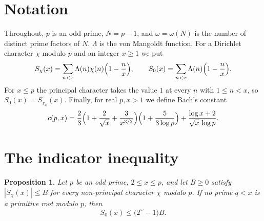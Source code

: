 \documentclass[11pt]{amsart}
\newtheorem{proposition}[theorem]{Proposition}
\theoremstyle{definition}
\theoremstyle{remark}
\newcommand{\Lam}{\Lambda}
\begin{document}
\section{Notation}\label{sec:setup}

Throughout, $p$ is an odd prime, $N=p-1$, and $\omega=\omega(N)$ is the number of distinct prime factors of $N$. $\Lam$ is the von Mangoldt function. For a Dirichlet character $\chi$ modulo $p$ and an integer $x\ge 1$ we put
\[
S_\chi(x)=\sum_{n<x}\Lam(n)\chi(n)\Bigl(1-\frac nx\Bigr),\qquad S_0(x)=\sum_{n<x}\Lam(n)\Bigl(1-\frac nx\Bigr).
\]
For $x\le p$ the principal character takes the value $1$ at every $n$ with $1\le n<x$, so $S_0(x)=S_{\chi_0}(x)$. Finally, for real $p,x>1$ we define Bach's constant
\begin{equation}\label{eq:cpx}
c(p,x)=\frac23\Bigl(1+\frac{2}{\sqrt x}+\frac{3}{x^{3/2}}\Bigr)\Bigl(1+\frac{5}{3\log p}\Bigr)+\frac{\log x+2}{\sqrt x\,\log p}.
\end{equation}

\section{The indicator inequality}\label{sec:indicator}

\begin{proposition}\label{prop:indicator}
Let $p$ be an odd prime, $2\le x\le p$, and let $B\ge 0$ satisfy $|S_\chi(x)|\le B$ for every non-principal character $\chi$ modulo $p$. If no prime $q<x$ is a primitive root modulo $p$, then
\[
S_0(x)\le \bigl(2^{\omega}-1\bigr)B .
\]
\end{proposition}
\end{document}
